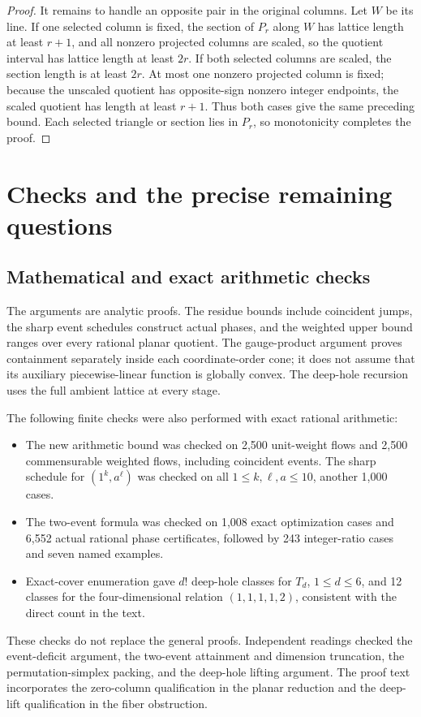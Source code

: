 \documentclass[11pt,a4paper]{article}
\theoremstyle{remark}\newtheorem{remark}[theorem]{Remark}
\begin{document}
\begin{proof}
It remains to handle an opposite pair in the original columns.
Let $W$ be its line. If one selected column is fixed, the section
of $P_r$ along $W$ has lattice length at least $r+1$, and all
nonzero projected columns are scaled, so the quotient interval
has lattice length at least $2r$. If both selected columns are
scaled, the section length is at least $2r$. At most one nonzero
projected column is fixed; because the unscaled quotient has
opposite-sign nonzero integer endpoints, the scaled quotient has
length at least $r+1$. Thus both cases give the same preceding
bound. Each selected triangle or section lies in $P_r$, so
monotonicity completes the proof.
\end{proof}



\section{Checks and the precise remaining questions}

\subsection{Mathematical and exact arithmetic checks}

The arguments are analytic proofs. The residue bounds include
coincident jumps, the sharp event schedules construct actual phases,
and the weighted upper bound ranges over every rational planar
quotient. The gauge-product argument proves containment separately
inside each coordinate-order cone; it does not assume that its
auxiliary piecewise-linear function is globally convex. The
deep-hole recursion uses the full ambient lattice at every stage.

The following finite checks were also performed with exact rational
arithmetic:
\begin{itemize}
\item The new arithmetic bound was checked on 2,500 unit-weight
flows and 2,500 commensurable weighted flows, including coincident
events. The sharp schedule for $(1^k,a^\ell)$ was checked on
all $1\le k,\ell,a\le10$, another 1,000 cases.
\item The two-event formula was checked on 1,008 exact optimization
cases and 6,552 actual rational phase certificates, followed by
243 integer-ratio cases and seven named examples.
\item Exact-cover enumeration gave $d!$ deep-hole classes for $T_d$,
$1\le d\le6$, and 12 classes for the four-dimensional relation
$(1,1,1,1,2)$, consistent with the direct count in the text.
\end{itemize}
These checks do not replace the general proofs. Independent readings
checked the event-deficit argument, the two-event attainment and
dimension truncation, the permutation-simplex packing, and the
deep-hole lifting argument. The proof text incorporates the
zero-column qualification in the planar reduction and the
deep-lift qualification in the fiber obstruction.
\end{document}
